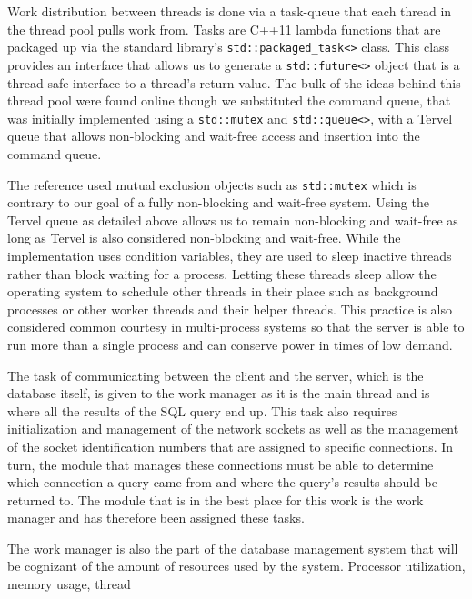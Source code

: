\documentclass[letterpaper, 12pt]{article}
\begin{document}
Work distribution between threads is done via a task-queue that each thread in the
thread pool pulls work from. Tasks are C++11 lambda functions that are packaged up
via the standard library's \lstinline|std::packaged_task<>|
 class.
This class provides an interface that allows us to generate a \lstinline|std::future<>|
object that is a thread-safe interface to a thread's return value. The bulk of the
ideas behind this thread pool were found online \cite{stackoverflow1} though we substituted
the command queue, that was initially implemented using a \lstinline|std::mutex|
and \lstinline|std::queue<>|, with a Tervel queue that allows
non-blocking and wait-free access and insertion into the command queue.
\par\vspace{\baselineskip}
The reference used mutual exclusion objects such as \lstinline|std::mutex|
which is contrary to our goal of a fully non-blocking and wait-free system. Using the Tervel
queue as detailed above allows us to remain non-blocking and wait-free as long as Tervel
is also considered non-blocking and wait-free. While the implementation uses condition variables,
they are used to sleep inactive threads rather than block waiting for a process. Letting these
threads sleep allow the operating system to schedule other threads in their place such as
background processes or other worker threads and their helper threads. This practice is also
considered common courtesy in multi-process systems so that the server is able to run more than
a single process and can conserve power in times of low demand.
\par\vspace{\baselineskip}
The task of communicating between the client and the server, which is the database itself,
is given to the work manager as it is the main thread and is where all the results of
the SQL query end up. This task also requires initialization and management of the network
sockets as well as the management of the socket identification numbers that are assigned
to specific connections. In turn, the module that manages these connections must be able to
determine which connection a query came from and where the query's results should be
returned to. The module that is in the best place for this work is the work manager
and has therefore been assigned these tasks.
\par\vspace{\baselineskip}
The work manager is also the part of the database management system that will be cognizant
of the amount of resources used by the system. Processor utilization, memory usage, thread
\end{document}
